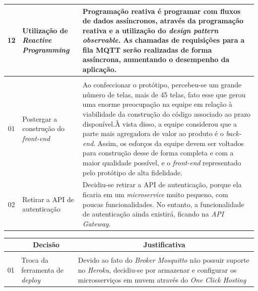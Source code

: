 \begin{apendicesenv}
\begin{table}[H]
\begin{adjustbox}{max width = \textwidth}
\begin{tabular}{|c|p{5cm}|p{10cm}|}
            \hline
            12 & Utilização de \textit{Reactive Programming} & Programação reativa é programar com fluxos de dados assíncronos, através da programação reativa e a utilização do \textit{design pattern observable}. As chamadas de requisições para a fila MQTT serão realizadas de forma assíncrona, aumentando o desempenho da aplicação. \\ 
            \hline
             \rowcolor[HTML]{1D3557}\multicolumn{3}{|c|}{\textbf{\color{white}Ponto de Controle 2}} \\
             
             \hline
            01 & Postergar a construção do \textit{front-end} & Ao confeccionar o protótipo, percebeu-se um grande número de telas, mais de 45 telas, fato esse que gerou uma enorme preocupação na equipe em relação à viabilidade da construção do código associado ao prazo disponível.À vista disso, a equipe considerou que a parte mais agregadora de valor ao produto é o \textit{back-end}. Assim, os esforços da equipe devem ser voltados para construção desse de forma completa e com a maior qualidade possível, e o \textit{front-end} representado pelo protótipo de alta fidelidade. \\ 
            \hline 02 & Retirar a API de autenticação & Decidiu-se retirar a API de autenticação, porque ela ficaria em um \textit{microservice} muito pequeno, com poucas funcionalidades. No entanto, a funcionalidade de autenticação ainda existirá, ficando na \textit{API Gateway}. \\
            \hline
        \end{tabular}
    \end{adjustbox}
\end{table}

\begin{table}[H]
    \centering
    \begin{adjustbox}{max width = \textwidth}
        \begin{tabular}{|c|p{5cm}|p{10cm}|}
            \hline
            \rowcolor[HTML]{A8DADC}
            \multicolumn{1}{|c}{\textbf{\#}} &
            \multicolumn{1}{|c}{\textbf{Decisão}} & \multicolumn{1}{|c|}{\textbf{Justificativa}} \\ 
            \hline
             \rowcolor[HTML]{1D3557}\multicolumn{3}{|c|}{\textbf{\color{white}Ponto de Controle 3}} \\
             \hline
            01 & Troca da ferramenta de \textit{deploy}  & Devido ao fato do \textit{Broker Mosquitto} não possuir suporte no \textit{Heroku}, decidiu-se por armazenar e configurar os microsserviços em nuvem através do \textit{One Click Hosting}\\ 
            \hline
        \end{tabular}
    \end{adjustbox}
\end{table}


\end{apendicesenv}
